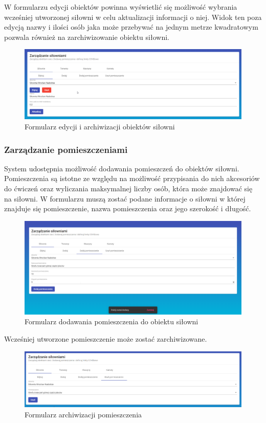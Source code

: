 \documentclass[a4paper,twoside,12pt]{book}
\begin{document}
W formularzu edycji obiektów powinna wyświetlić się możliwość wybrania wcześniej utworzonej siłowni w celu aktualizacji informacji o niej. Widok ten poza edycją nazwy i ilości osób jaka może przebywać na jednym metrze kwadratowym pozwala również na zarchiwizowanie obiektu siłowni.
\begin{figure}[H]
	\centering
	\includegraphics[width=1\linewidth]{../zrzuty_ekranu/dzialanie/obiekty/edycja}
	\caption{Formularz edycji i archiwizacji obiektów siłowni}
	\label{fig:edycja}
\end{figure}


\subsubsection{Zarządzanie pomieszczeniami}
System udostępnia możliwość dodawania pomieszczeń do obiektów siłowni. Pomieszczenia są istotne ze względu na możliwość przypisania do nich akcesoriów do ćwiczeń oraz wyliczania maksymalnej liczby osób, która może znajdować się na siłowni. W formularzu muszą zostać podane informacje o siłowni w której znajduje się pomieszczenie, nazwa pomieszczenia oraz jego szerokość i długość.
\begin{figure}[H]
	\centering
	\includegraphics[width=1\linewidth]{../zrzuty_ekranu/dzialanie/pomieszczenia/dodawanie}
	\caption{Formularz dodawania pomieszczenia do obiektu siłowni}
	\label{fig:dodawanie_pomieszczenia}
\end{figure}

Wcześniej utworzone pomieszczenie może zostać zarchiwizowane.
\begin{figure}[H]
	\centering
	\includegraphics[width=1\linewidth]{../zrzuty_ekranu/dzialanie/pomieszczenia/usuwanie}
	\caption{Formularz archiwizacji pomieszczenia}
	\label{fig:archwizacja_pomieszczenia}
\end{figure}
\end{document}
